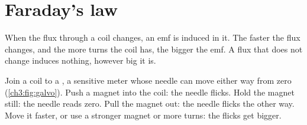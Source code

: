 \section{Faraday's law}\label{ch3:sec:faraday}

\begin{bigidea}
When the flux through a coil changes, an emf is induced in it. The faster the
flux changes, and the more turns the coil has, the bigger the emf. A flux that
does not change induces nothing, however big it is.
\end{bigidea}

\begin{keywords}
\end{keywords}

Join a coil to a , a sensitive meter whose needle can move
either way from zero (\cref{ch3:fig:galvo}). Push a magnet into the coil: the
needle flicks. Hold the magnet still: the needle reads zero. Pull the magnet out:
the needle flicks the other way. Move it faster, or use a stronger magnet or more
turns: the flicks get bigger.

